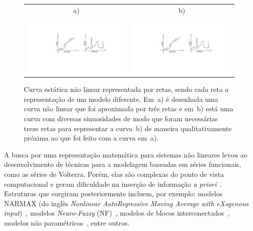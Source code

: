 \begin{figure}[htb]
	\centering
	\label{fig:cap1naolinearidade}
	\begin{tabular}{cc}
		a) & b)\\
		\includegraphics[scale=0.6,trim=85mm 70mm 150mm 55mm,clip=true]{figuras/cap1naolinearidade} &
		\includegraphics[scale=0.6,trim=176mm 70mm 50mm 55mm,clip=true]{figuras/cap1naolinearidade}
	\end{tabular}
	\caption[Curva estática não linear representada por retas, sendo cada reta a representação de um modelo diferente.]{Curva estática não linear representada por retas, sendo cada reta a representação de um modelo diferente. Em~a) é desenhada uma curva não linear que foi aproximada por três retas e em~b) está uma curva com diversas sinuosidades de modo que foram necessárias treze retas para representar a curva~b) de maneira qualitativamente próxima ao que foi feito com a curva em~a).}
\end{figure}
\par 
A busca por uma representação matemática para sistemas não lineares levou ao desenvolvimento de técnicas para a modelagem baseadas em séries funcionais, como as séries de Volterra. Porém, elas são complexas do ponto de vista computacional e geram dificuldade na inserção de informação \textit{a priori}~\citep{borjas2013}. Estruturas que surgiram posteriormente incluem, por exemplo: modelos \acs{NARMAX} (do inglês \textit{Nonlinear AutoRegressive Moving Average with eXogenous input})~\citep{billings2013}, modelos \textit{Neuro-Fuzzy} (\acs{NF})~\citep{nelles2020}, modelos de blocos interconectados~\citep{mzyk2014}, modelos não paramétricos~\citep{ljung2010}, entre outros. 
